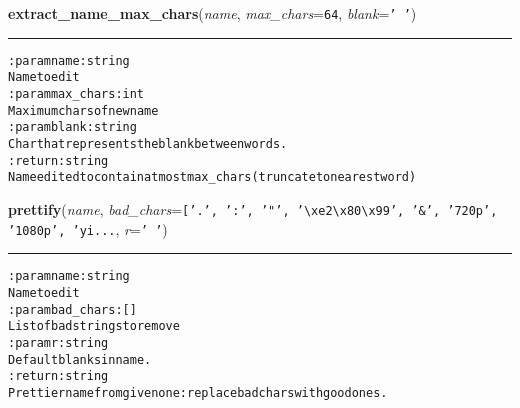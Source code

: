     \vspace{0.5ex}

\hspace{.8\funcindent}\begin{boxedminipage}{\funcwidth}

    \raggedright \textbf{extract\_name\_max\_chars}(\textit{name}, \textit{max\_chars}={\tt 64}, \textit{blank}={\tt \texttt{'}\texttt{ }\texttt{'}})

    \vspace{-1.5ex}

    \rule{\textwidth}{0.5\fboxrule}
\setlength{\parskip}{2ex}
\begin{alltt}

:param name: string
    Name to edit
:param max\_chars: int
    Maximum chars of new name
:param blank: string
    Char that represents the blank between words.
:return: string
    Name edited to contain at most max\_chars (truncate to nearest word)
\end{alltt}

\setlength{\parskip}{1ex}
    \end{boxedminipage}

    \label{hal:files:models:FileSystem:prettify}

    \vspace{0.5ex}

\hspace{.8\funcindent}\begin{boxedminipage}{\funcwidth}

    \raggedright \textbf{prettify}(\textit{name}, \textit{bad\_chars}={\tt \texttt{[}\texttt{'}\texttt{.}\texttt{'}\texttt{, }\texttt{'}\texttt{:}\texttt{'}\texttt{, }\texttt{'}\texttt{"}\texttt{'}\texttt{, }\texttt{'}\texttt{{\textbackslash}xe2{\textbackslash}x80{\textbackslash}x99}\texttt{'}\texttt{, }\texttt{'}\texttt{\&}\texttt{'}\texttt{, }\texttt{'}\texttt{720p}\texttt{'}\texttt{, }\texttt{'}\texttt{1080p}\texttt{'}\texttt{, }\texttt{'}\texttt{yi}\texttt{...}}, \textit{r}={\tt \texttt{'}\texttt{ }\texttt{'}})

    \vspace{-1.5ex}

    \rule{\textwidth}{0.5\fboxrule}
\setlength{\parskip}{2ex}
\begin{alltt}

:param name: string
    Name to edit
:param bad\_chars: []
    List of bad strings to remove
:param r: string
    Default blanks in name.
:return: string
    Prettier name from given one: replace bad chars with good ones.
\end{alltt}

\setlength{\parskip}{1ex}
    \end{boxedminipage}

